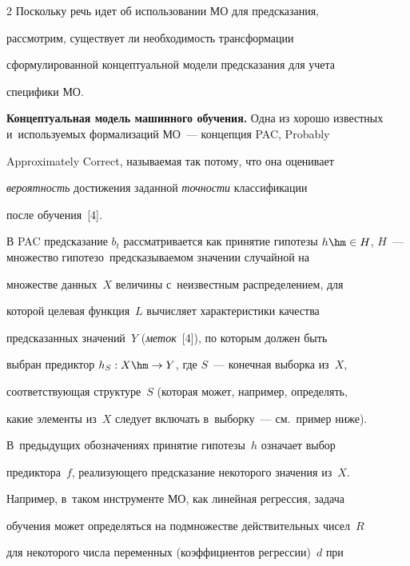 \begin{multicols}{2}
  Поскольку речь идет об использовании МО для предсказания, 


рассмотрим, существует ли необходимость трансформации 


сформулированной концептуальной модели предсказания для учета 


специфики МО. 





\smallskip


  


  \textbf{Концептуальная модель машинного обуче\-ния.} Одна из хорошо известных и~используемых формализаций МО~--- концепция PAC, Probably 


Approximately Correct, называемая так потому, что она оценивает 


\textit{ве\-ро\-ят\-ность} достижения заданной \textit{точности} классификации 


после обуче\-ния~[4]. 


  


  В PAC предсказание $b_t$ рассматривается как принятие гипотезы $h\hm\in 


H$, $H$~--- множество гипотез\linebreak о~предсказываемом значении случайной на 


мно\-жестве данных~$X$ величины с~неизвестным распределением, для 


которой целевая функция~$L$ вычисляет характеристики качества 


предсказанных \mbox{значений}~$Y$ (\textit{меток}~[4]), по которым должен быть 


выбран предиктор $h_S : X\hm\to Y$, где $S$~--- конечная выборка из~$X$, 


соответствующая структуре~$S$ (которая может, например, определять, 


какие элементы из~$X$ следует включать в~выборку~--- см.\ пример ниже). 


В~предыдущих обозначениях принятие гипотезы~$h$ означает выбор 


предиктора~$f$, реализующего предсказание некоторого значения из~$X$. 


Например, в~таком инструменте МО, как линейная регрессия, задача 


обучения может определяться на подмножестве действительных чисел~$R$ 


для некоторого чис\-ла переменных (коэффициентов регрессии)~$d$ при 



\end{multicols}
